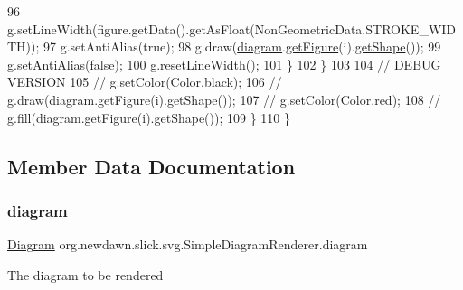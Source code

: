 \begin{DoxyCode}
96                     g.setLineWidth(figure.getData().getAsFloat(NonGeometricData.STROKE\_WIDTH));
97                     g.setAntiAlias(\textcolor{keyword}{true});
98                     g.draw(\mbox{\hyperlink{classorg_1_1newdawn_1_1slick_1_1svg_1_1_simple_diagram_renderer_a2b56dad891d98b19da92cd43376e02e8}{diagram}}.\mbox{\hyperlink{classorg_1_1newdawn_1_1slick_1_1svg_1_1_diagram_aa331087982df2abf665a0b8bb7787118}{getFigure}}(i).\mbox{\hyperlink{classorg_1_1newdawn_1_1slick_1_1svg_1_1_figure_a980b7a979c218c2a73897ba47a2b3a17}{getShape}}());
99                     g.setAntiAlias(\textcolor{keyword}{false});
100                     g.resetLineWidth();
101                 \}
102             \}
103     
104             \textcolor{comment}{// DEBUG VERSION}
105 \textcolor{comment}{//          g.setColor(Color.black);}
106 \textcolor{comment}{//          g.draw(diagram.getFigure(i).getShape());}
107 \textcolor{comment}{//          g.setColor(Color.red);}
108 \textcolor{comment}{//          g.fill(diagram.getFigure(i).getShape());}
109         \}
110     \}
\end{DoxyCode}


\subsection{Member Data Documentation}
\mbox{\label{classorg_1_1newdawn_1_1slick_1_1svg_1_1_simple_diagram_renderer_a2b56dad891d98b19da92cd43376e02e8}} 
\subsubsection{\texorpdfstring{diagram}{diagram}}
{\footnotesize\ttfamily \mbox{\hyperlink{classorg_1_1newdawn_1_1slick_1_1svg_1_1_diagram}{Diagram}} org.\+newdawn.\+slick.\+svg.\+Simple\+Diagram\+Renderer.\+diagram}

The diagram to be rendered \mbox{\label{classorg_1_1newdawn_1_1slick_1_1svg_1_1_simple_diagram_renderer_adf6a659eed43175642b1d1ec2f94615b}} 
